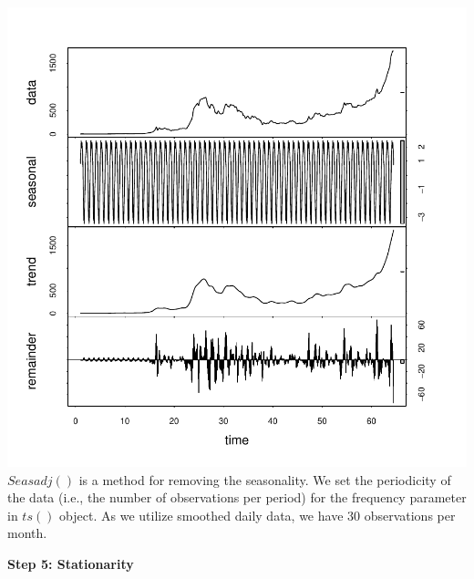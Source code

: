 \documentclass{article}
\begin{document}
\begin{Schunk}
\end{Schunk}
\includegraphics{Report-011}
$Seasadj()$ is a method for removing the seasonality. We set the periodicity of the data (i.e., the number of observations per period) for the frequency parameter in $ts()$ object. As we utilize smoothed daily data, we have 30 observations per month.

\textbf{Step 5: Stationarity}
\end{document}

